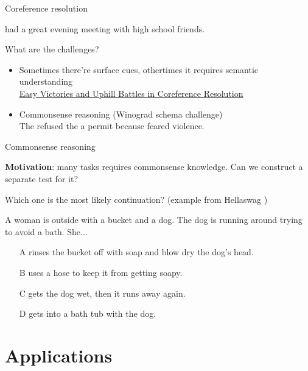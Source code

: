\documentclass[usenames,dvipsnames,notes,11pt,aspectratio=169,hyperref={colorlinks=true, linkcolor=blue}]{beamer}
\newcommand{\pdfnote}[1]{}
\begin{document}
\begin{frame}
    {Coreference resolution}

     had a great evening meeting with  high school friends.\par

    What are the challenges?\\\pause
    \begin{itemize}
        \item Sometimes there're surface cues, othertimes it requires semantic understanding\\
            \href{https://nlp.cs.berkeley.edu/pubs/Durrett-Klein_2013_Coreference_paper.pdf}{Easy Victories and Uphill Battles in Coreference Resolution} 
        \item Commonsense reasoning (Winograd schema challenge)\\\medskip
            The  refused the  a permit because  feared violence.\par
    \end{itemize}
\end{frame}

\begin{frame}
    {Commonsense reasoning}

    \textbf{Motivation}: many tasks requires commonsense knowledge. Can we construct a separate test for it?\pause

    \bigskip
    Which one is the most likely continuation? (example from Hellaswag )

    A woman is outside with a bucket and a dog. The dog is running around trying to avoid a bath. She...\\
    \begin{itemize}
        \item[A] rinses the bucket off with soap and blow dry the dog’s head.
        \item[B] uses a hose to keep it from getting soapy.
        \item[C] gets the dog wet, then it runs away again.
        \item[D] gets into a bath tub with the dog.
    \end{itemize}
    \pdfnote{C}
\end{frame}

\section{Applications}
\end{document}
